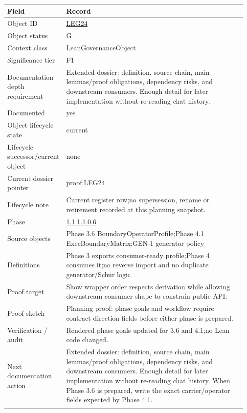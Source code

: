 \begin{longtable}{L{0.16\linewidth} L{0.81\linewidth}}
\hline
\textbf{Field} & \textbf{Record}\\
\hline
Object ID & \hyperlink{object-row-LEG24}{LEG24}\\
\hline\addlinespace[0.20em]
Object status & G\\
\hline\addlinespace[0.20em]
Context class & LeanGovernanceObject\\
\hline\addlinespace[0.20em]
Significance tier & F1\\
\hline\addlinespace[0.20em]
Documentation depth requirement & Extended dossier: definition, source chain, main lemmas/\allowbreak{}proof obligations, dependency risks, and downstream consumers. Enough detail for later implementation without re-reading chat history.\\
\hline\addlinespace[0.20em]
Documented & yes\\
\hline\addlinespace[0.20em]
Object lifecycle state & current\\
\hline\addlinespace[0.20em]
Lifecycle successor/\allowbreak{}current object & none\\
\hline\addlinespace[0.20em]
Current dossier pointer & proof:LEG24\\
\hline\addlinespace[0.20em]
Lifecycle note & Current register row;\newline no supersession, rename or retirement recorded at this planning snapshot.\\
\hline\addlinespace[0.20em]
Phase & \hyperlink{phase-row-1-1-1-1-0-6}{1.1.1.1.0.6}\\
\hline\addlinespace[0.20em]
Source objects & Phase 3.6 BoundaryOperatorProfile;\newline Phase 4.1 ExecBoundaryMatrix;\newline GEN-1 generator policy\\
\hline\addlinespace[0.20em]
Definitions & Phase 3 exports consumer-ready profile;\newline Phase 4 consumes it;\newline no reverse import and no duplicate generator/\allowbreak{}Schur logic\\
\hline\addlinespace[0.20em]
Proof target & Show wrapper order respects derivation while allowing downstream consumer shape to constrain public API.\\
\hline\addlinespace[0.20em]
Proof sketch & Planning proof: phase goals and workflow require contract direction fields before either phase is prepared.\\
\hline\addlinespace[0.20em]
Verification /\allowbreak{} audit & Rendered phase goals updated for 3.6 and 4.1;\newline no Lean code changed.\\
\hline\addlinespace[0.20em]
Next documentation action & Extended dossier: definition, source chain, main lemmas/\allowbreak{}proof obligations, dependency risks, and downstream consumers. Enough detail for later implementation without re-reading chat history. When Phase 3.6 is prepared, write the exact carrier/\allowbreak{}operator fields expected by Phase 4.1.\\
\hline\addlinespace[0.20em]
\end{longtable}

